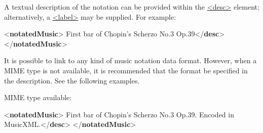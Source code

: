 A textual description of the notation can be provided within the \hyperref[TEI.desc]{<desc>} element; alternatively, a \hyperref[TEI.label]{<label>} may be supplied. For example:\par\bgroup{}\exampleFont \begin{shaded}\noindent\mbox{}{<\textbf{notatedMusic}>}\mbox{}\newline 
{}\mbox{}\newline 
{}First bar of Chopin's Scherzo No.3 Op.39{</\textbf{desc}>}\mbox{}\newline 
{</\textbf{notatedMusic}>}\end{shaded}\egroup\par \par
It is possible to link to any kind of music notation data format. However, when a MIME type is not available, it is recommended that the format be specified in the description. See the following examples.\par
MIME type available:\par\bgroup{}\exampleFont \begin{shaded}\noindent\mbox{}{<\textbf{notatedMusic}>}\mbox{}\newline 
{}\mbox{}\newline 
{}First bar of Chopin's Scherzo No.3 Op.39. Encoded in\mbox{}\newline 
\hspace*{1em}\hspace*{1em} MusicXML.{</\textbf{desc}>}\mbox{}\newline 
{</\textbf{notatedMusic}>}\end{shaded}\egroup\par \par

